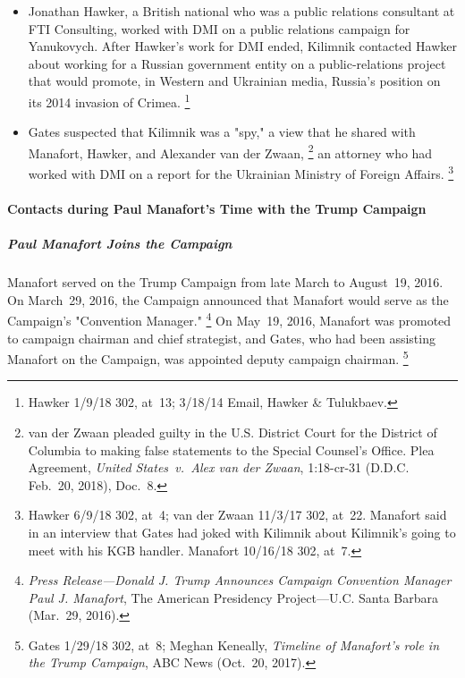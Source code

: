 \begin{itemize}
    \item Jonathan Hawker, a British national who was a public relations consultant at FTI Consulting, worked with DMI on a public relations campaign for Yanukovych.
    After Hawker's work for DMI ended, Kilimnik contacted Hawker about working for a Russian government entity on a public-relations project that would promote, in Western and Ukrainian media, Russia's position on its 2014 invasion of Crimea.%
\footnote{Hawker 1/9/18 302, at~13;
3/18/14 Email, Hawker \& Tulukbaev.}

    \item Gates suspected that Kilimnik was a "spy," a view that he shared with Manafort, Hawker, and Alexander van der Zwaan,%
\footnote{van der Zwaan pleaded guilty in the U.S. District Court for the District of Columbia to making false statements to the Special Counsel's Office.
Plea Agreement, \textit{United States~v.\ Alex van der Zwaan}, 1:18-cr-31 (D.D.C. Feb.~20, 2018), Doc.~8.}
    an attorney who had worked with DMI on a report for the Ukrainian Ministry of Foreign Affairs.%
\footnote{Hawker 6/9/18 302, at~4;
van der Zwaan 11/3/17 302, at~22.
Manafort said in an interview that Gates had joked with Kilimnik about Kilimnik's going to meet with his KGB handler.
Manafort 10/16/18 302, at~7.}
\end{itemize}


\paragraph{Contacts during Paul Manafort's Time with the Trump Campaign}

\subparagraph{Paul Manafort Joins the Campaign}

Manafort served on the Trump Campaign from late March to August~19, 2016.
On March~29, 2016, the Campaign announced that Manafort would serve as the Campaign's "Convention Manager."%
\footnote{\textit{Press Release---Donald J. Trump Announces Campaign Convention Manager Paul J. Manafort}, The American Presidency Project---U.C. Santa Barbara (Mar.~29, 2016).}
On May~19, 2016, Manafort was promoted to campaign chairman and chief strategist, and Gates, who had been assisting Manafort on the Campaign, was appointed deputy campaign chairman.%
\footnote{Gates 1/29/18 302, at~8; Meghan Keneally, \textit{Timeline of Manafort's role in the Trump Campaign}, ABC News (Oct.~20, 2017).}

